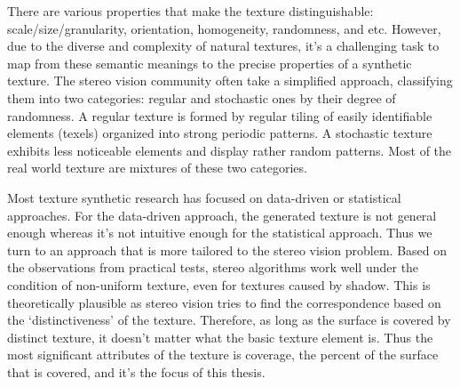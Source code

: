 There are various properties that make the texture distinguishable: scale/size/granularity, orientation, homogeneity, randomness, and etc. However, due to the diverse and complexity of natural textures, it's a challenging task to map from these semantic meanings to the precise properties of a synthetic texture. The stereo vision community often take a simplified approach, classifying them into two categories: regular and stochastic ones by their degree of randomness. A regular texture is formed by regular tiling of easily identifiable elements (texels) organized into strong periodic patterns. A stochastic texture exhibits less noticeable elements and display rather random patterns. Most of the real world texture are mixtures of these two categories.

Most texture synthetic research has focused on data-driven or statistical approaches. For the data-driven approach, the generated texture is not general enough whereas it's not intuitive enough for the statistical approach. Thus we turn to an approach that is more tailored to the stereo vision problem. Based on the observations from practical tests, stereo algorithms work well under the condition of non-uniform texture, even for textures caused by shadow. This is theoretically plausible as stereo vision tries to find the correspondence based on the `distinctiveness' of the texture. Therefore, as long as the surface is covered by distinct texture, it doesn't matter what the basic texture element is. Thus the most significant attributes of the texture is coverage, \ie the percent of the surface that is covered, and it's the focus of this thesis.



